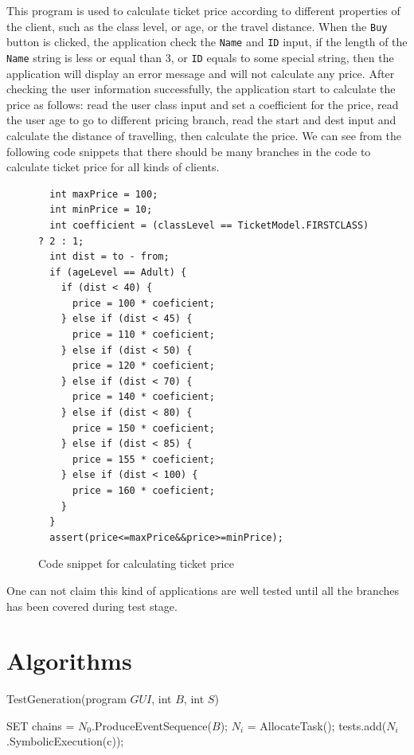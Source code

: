 \documentclass[blind]{sig-alternate-05-2015}
\begin{document}
This program is used to calculate ticket price according to different properties of the client, such as the class level, or age, or the travel distance. When the \texttt{Buy} button is clicked, the application check the \texttt{Name} and \texttt{ID} input, if the length of the \texttt{Name} string is less or equal than 3, or \texttt{ID} equals to some special string, then the application will display an error message and will not calculate any price. After checking the user information successfully, the application start to calculate the price as follows: read the user class input and set a coefficient for the price, read the user age to go to different pricing branch, read the start and dest input and calculate the distance of travelling, then calculate the price. We can see from the following code snippets that there should be many branches in the code to calculate ticket price for all kinds of clients.
\begin{figure}
\label{fig:code}
\begin{lstlisting}
  int maxPrice = 100;
  int minPrice = 10;
  int coefficient = (classLevel == TicketModel.FIRSTCLASS) ? 2 : 1;
  int dist = to - from;
  if (ageLevel == Adult) {
    if (dist < 40) {
      price = 100 * coeficient;
    } else if (dist < 45) {
      price = 110 * coeficient;
    } else if (dist < 50) {
      price = 120 * coeficient;
    } else if (dist < 70) {
      price = 140 * coeficient;
    } else if (dist < 80) {
      price = 150 * coeficient;
    } else if (dist < 85) {
      price = 155 * coeficient;
    } else if (dist < 100) {
      price = 160 * coeficient;
    }
  }
  assert(price<=maxPrice&&price>=minPrice);
\end{lstlisting}
\caption{Code snippet for calculating ticket price}
\end{figure}

One can not claim this kind of applications are well tested until all the branches has been covered during test stage.

\section{Algorithms}

\begin{algorithm}[htbp]
\caption{TestGeneration(program $GUI$, int $B$, int $S$)}
\label{alg:top}
\begin{algorithmic}[1]
\STATE SET chains = $N_0$.ProduceEventSequence($B$); 
	\STATE $N_i$ = AllocateTask();
	\STATE tests.add($N_i$.SymbolicExecution(c));
\ENDFOR
\end{algorithmic}
\end{algorithm}
\end{document}
